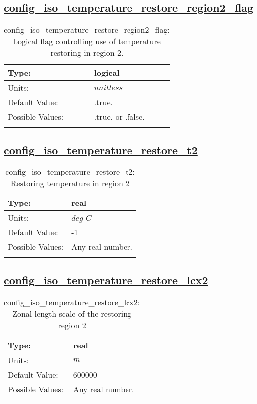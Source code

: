 \subsection[config\_iso\_temperature\_restore\_region2\_flag]{\hyperref[sec:nm_tab_iso]{config\_iso\_temperature\_restore\_region2\_flag}}
\label{subsec:nm_sec_config_iso_temperature_restore_region2_flag}
\begin{center}
\begin{longtable}{| p{2.0in} || p{4.0in} |}
    \hline
    Type: & logical \\
    \hline
    Units: & $unitless$ \\
    \hline
    Default Value: & .true. \\
    \hline
    Possible Values: & .true. or .false. \\
    \hline
    \caption{config\_iso\_temperature\_restore\_region2\_flag: Logical flag controlling use of temperature restoring in region 2.}
\end{longtable}
\end{center}
\subsection[config\_iso\_temperature\_restore\_t2]{\hyperref[sec:nm_tab_iso]{config\_iso\_temperature\_restore\_t2}}
\label{subsec:nm_sec_config_iso_temperature_restore_t2}
\begin{center}
\begin{longtable}{| p{2.0in} || p{4.0in} |}
    \hline
    Type: & real \\
    \hline
    Units: & $deg$ $C$ \\
    \hline
    Default Value: & -1 \\
    \hline
    Possible Values: & Any real number. \\
    \hline
    \caption{config\_iso\_temperature\_restore\_t2: Restoring temperature in region 2}
\end{longtable}
\end{center}
\subsection[config\_iso\_temperature\_restore\_lcx2]{\hyperref[sec:nm_tab_iso]{config\_iso\_temperature\_restore\_lcx2}}
\label{subsec:nm_sec_config_iso_temperature_restore_lcx2}
\begin{center}
\begin{longtable}{| p{2.0in} || p{4.0in} |}
    \hline
    Type: & real \\
    \hline
    Units: & $m$ \\
    \hline
    Default Value: & 600000 \\
    \hline
    Possible Values: & Any real number. \\
    \hline
    \caption{config\_iso\_temperature\_restore\_lcx2: Zonal length scale of the restoring region 2}
\end{longtable}
\end{center}
